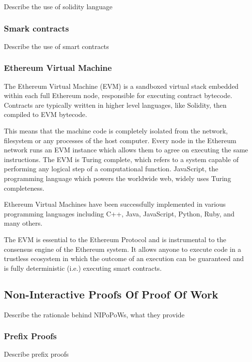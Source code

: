 \documentclass{article}
\begin{document}
  Describe the use of solidity language

  \subsubsection{Smark contracts}

  Describe the use of smart contracts

  \subsubsection{Ethereum Virtual Machine}

  The Ethereum Virtual Machine (EVM) is a sandboxed virtual stack
  embedded within each full Ethereum node, responsible for executing
  contract bytecode. Contracts are typically written in higher level
  languages, like Solidity, then compiled to EVM bytecode.

  This means that the machine code is completely isolated from the
  network, filesystem or any processes of the host computer. Every node
  in the Ethereum network runs an EVM instance which allows them to
  agree on executing the same instructions. The EVM is Turing complete,
  which refers to a system capable of performing any logical step of a
  computational function. JavaScript, the programming language which
  powers the worldwide web, widely uses Turing completeness.

  Ethereum Virtual Machines have been successfully implemented in
  various programming languages including C++, Java, JavaScript, Python,
  Ruby, and many others.

  The EVM is essential to the Ethereum Protocol and is instrumental to
  the consensus engine of the Ethereum system. It allows anyone to
  execute code in a trustless ecosystem in which the outcome of an
  execution can be guaranteed and is fully deterministic (i.e.)
  executing smart contracts.

  \subsection{Non-Interactive Proofs Of Proof Of Work}

  Describe the rationale behind NIPoPoWs, what they provide

  \subsubsection{Prefix Proofs}

  Describe prefix proofs
\end{document}
